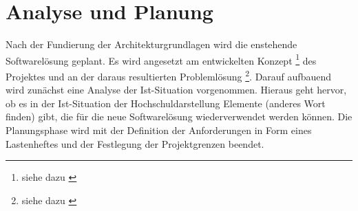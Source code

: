 \section{Analyse und Planung}
\label{sec:AnalyseUndPlanung}

Nach der Fundierung der Architekturgrundlagen wird die enstehende Softwarelösung geplant. Es wird angesetzt am 
entwickelten Konzept \footnote{siehe dazu \citet{unternehmensfuehrung2014}} des Projektes und an der daraus resultierten Problemlösung \footnote{siehe dazu \citet{unternehmensfuehrung2014}}. Darauf aufbauend wird zunächst eine Analyse der Ist-Situation vorgenommen. 
Hieraus geht hervor, ob es in der Ist-Situation der Hochschuldarstellung Elemente (anderes Wort finden) gibt, die für die 
neue Softwarelösung wiederverwendet werden können. Die Planungsphase wird mit der Definition der Anforderungen in 
Form eines Lastenheftes und der Festlegung der Projektgrenzen beendet.